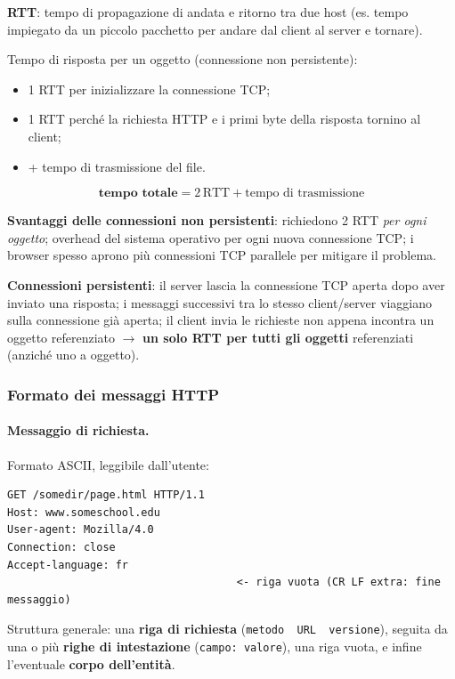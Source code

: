 \documentclass[12pt, a4paper]{article}
\begin{document}
\begin{tcolorbox}[colback=lightergray!10, colframe=tocsec, title=\textbf{Round-Trip Time (RTT) e tempo di risposta}]
\textbf{RTT}: tempo di propagazione di andata e ritorno tra due host (es. tempo impiegato da un piccolo pacchetto per andare dal client al server e tornare).

Tempo di risposta per un oggetto (connessione non persistente):
\begin{itemize}
    \item 1 RTT per inizializzare la connessione TCP;
    \item 1 RTT perché la richiesta HTTP e i primi byte della risposta tornino al client;
    \item + tempo di trasmissione del file.
\end{itemize}
$$\textbf{tempo totale} = 2\,\text{RTT} + \text{tempo di trasmissione}$$
\end{tcolorbox}

\textbf{Svantaggi delle connessioni non persistenti}: richiedono 2 RTT \textit{per ogni oggetto}; overhead del sistema operativo per ogni nuova connessione TCP; i browser spesso aprono più connessioni TCP parallele per mitigare il problema.

\textbf{Connessioni persistenti}: il server lascia la connessione TCP aperta dopo aver inviato una risposta; i messaggi successivi tra lo stesso client/server viaggiano sulla connessione già aperta; il client invia le richieste non appena incontra un oggetto referenziato $\to$ \textbf{un solo RTT per tutti gli oggetti} referenziati (anziché uno a oggetto).

\subsubsection{Formato dei messaggi HTTP}

\paragraph{Messaggio di richiesta.} Formato ASCII, leggibile dall'utente:
\begin{verbatim}
GET /somedir/page.html HTTP/1.1
Host: www.someschool.edu
User-agent: Mozilla/4.0
Connection: close
Accept-language: fr
                                    <- riga vuota (CR LF extra: fine messaggio)
\end{verbatim}
Struttura generale: una \textbf{riga di richiesta} (\texttt{metodo\ \ URL\ \ versione}), seguita da una o più \textbf{righe di intestazione} (\texttt{campo: valore}), una riga vuota, e infine l'eventuale \textbf{corpo dell'entità}.
\end{document}
